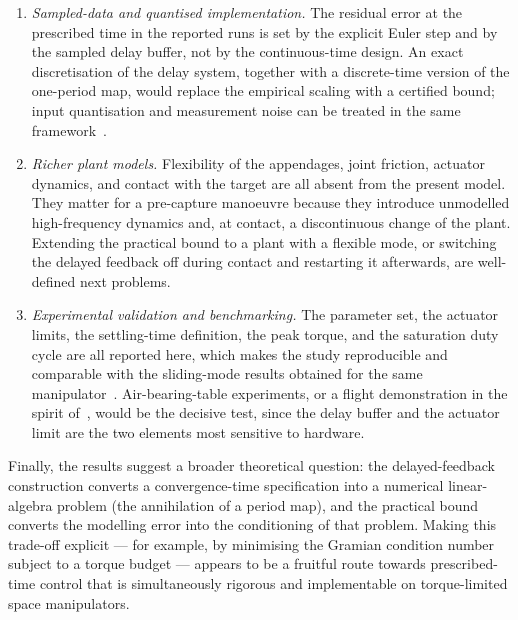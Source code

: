 \begin{enumerate}
\item \emph{Sampled-data and quantised implementation.} The residual error at the prescribed time in the reported runs is set by the explicit Euler step and by the sampled delay buffer, not by the continuous-time design. An exact discretisation of the delay system, together with a discrete-time version of the one-period map, would replace the empirical scaling with a certified bound; input quantisation and measurement noise can be treated in the same framework~\cite{hu2025preassigned}.
\item \emph{Richer plant models.} Flexibility of the appendages, joint friction, actuator dynamics, and contact with the target are all absent from the present model. They matter for a pre-capture manoeuvre because they introduce unmodelled high-frequency dynamics and, at contact, a discontinuous change of the plant. Extending the practical bound to a plant with a flexible mode, or switching the delayed feedback off during contact and restarting it afterwards, are well-defined next problems.
\item \emph{Experimental validation and benchmarking.} The parameter set, the actuator limits, the settling-time definition, the peak torque, and the saturation duty cycle are all reported here, which makes the study reproducible and comparable with the sliding-mode results obtained for the same manipulator~\cite{dou2025fractional}. Air-bearing-table experiments, or a flight demonstration in the spirit of~\cite{yoshida2003etsvii}, would be the decisive test, since the delay buffer and the actuator limit are the two elements most sensitive to hardware.
\end{enumerate}

Finally, the results suggest a broader theoretical question: the delayed-feedback construction converts a convergence-time specification into a numerical linear-algebra problem (the annihilation of a period map), and the practical bound converts the modelling error into the conditioning of that problem. Making this trade-off explicit --- for example, by minimising the Gramian condition number subject to a torque budget --- appears to be a fruitful route towards prescribed-time control that is simultaneously rigorous and implementable on torque-limited space manipulators.
